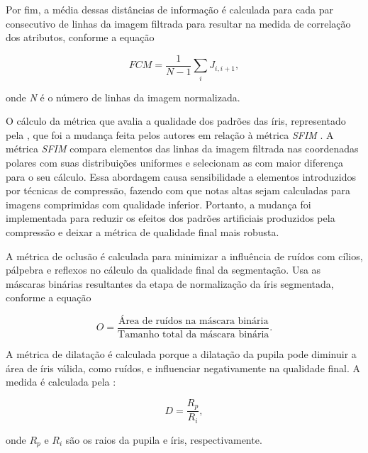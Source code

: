 \par Por fim, a média dessas distâncias de informação é calculada para cada par consecutivo de linhas da imagem filtrada para resultar na medida de correlação dos atributos, conforme a equação

\begin{equation}\label{eq:fce:fcm5}
    FCM = \frac{1}{N - 1}\sum_{i}J_{i, i+1},
\end{equation}

\noindent onde \textit{N} é o número de linhas da imagem normalizada. 

\par O cálculo da métrica que avalia a qualidade dos padrões das íris, representado pela , que foi a mudança feita pelos autores em relação à métrica \textit{\acrshort{SFIM}} \cite{belcher2008}. A métrica \textit{\acrshort{SFIM}} compara elementos das linhas da imagem filtrada nas coordenadas polares com suas distribuições uniformes e selecionam as com maior diferença para o seu cálculo. Essa abordagem causa sensibilidade a elementos introduzidos por técnicas de compressão, fazendo com que notas altas sejam calculadas para imagens comprimidas com qualidade inferior. Portanto, a mudança foi implementada para reduzir os efeitos dos padrões artificiais produzidos pela compressão e deixar a métrica de qualidade final mais robusta.

\par A métrica de oclusão é calculada para minimizar a influência de ruídos com cílios, pálpebra e reflexos no cálculo da qualidade final da segmentação. Usa as máscaras binárias resultantes da etapa de normalização da íris segmentada, conforme a equação

\begin{equation}\label{eq:fce:O}
    O = \frac{\text{Área de ruídos na máscara binária}}{\text{Tamanho total da máscara binária}}.
\end{equation}

\par A métrica de dilatação é calculada porque a dilatação da pupila pode diminuir a área de íris válida, como ruídos, e influenciar negativamente na qualidade final.
A medida é calculada pela :

\begin{equation}\label{eq:fce:D}
    D = \frac{R_{p}}{R_{i}},
\end{equation}

\noindent onde $R_{p}$ e $R_{i}$ são os raios da pupila e íris, respectivamente.

